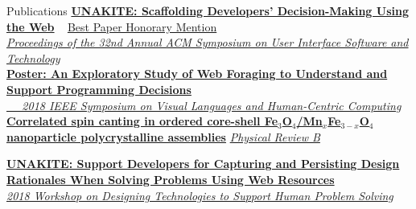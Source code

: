 \documentclass{resume}
\begin{document}
\begin{rSection}{Publications}
{\href{http://www.cs.cmu.edu/~NatProg/papers/p67-liu-Unakite-UIST.pdf}{\bf UNAKITE: Scaffolding Developers’ Decision-Making Using the Web} ~ \underline{Best Paper Honorary Mention}} \\
{\em  \href{https://dl.acm.org/citation.cfm?id=3347908}{\hfill Proceedings of the 32nd Annual ACM Symposium on User Interface Software and Technology}} \\
\small
\href{http://www.cs.cmu.edu/~NatProg/papers/p305-hsieh.pdf}{\bf Poster: An Exploratory Study of Web Foraging to Understand and Support Programming Decisions }\\
\normalsize
\href{https://ieeexplore.ieee.org/document/8506517}{\em ~~ \hfill  2018 IEEE Symposium on Visual Languages and Human-Centric Computing} \\
{\href{https://janeon.github.io/assets/img/PhysRevB.99.094421.pdf}{\bf Correlated spin canting in ordered core-shell Fe$_3$O$_4$/Mn$_x$Fe$_{3-x}$O$_4$ nanoparticle polycrystalline assemblies} \hfill \href{https://journals.aps.org/prb/abstract/10.1103/PhysRevB.99.094421}{\em Physical Review B}} 

\small
{\href{http://www.cs.cmu.edu/~NatProg/papers/DTSHPS%20paper%207%20-%20one-page-summary-with-references%20v2.pdf}{\bf UNAKITE: Support Developers for Capturing and Persisting Design Rationales When Solving Problems Using Web Resources} ~~~~~~~~~ \href{https://digital.lib.washington.edu/researchworks/bitstream/handle/1773/42857/DTSHPS18-Proceedings-final%20v2.pdf}{\em 2018 Workshop on Designing Technologies to Support Human Problem Solving}}
\end{rSection} \normalsize 
\end{document}
